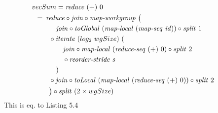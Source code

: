 \begin{align}
  &\hspace{-1.5em}vecSum = \reduce\ (+)\ 0\nonumber\\
  &\hspace{-2em}\quad\begin{aligned}
    &=\hspace{.2em}
      \reduce \circ \join \circ \mapWorkgroup\ \big(\\
      &\qquad\quad \join \circ \toGlobal\ (\mapLocal\ (\mapSeq\ \id)) \circ \splitN\ 1\\
      &\qquad \circ \iterateN\ (log_2\ wgSize)\ (\\
      &\qquad\qquad \join \circ \mapLocal\ (\reduceSeq\ (+)\ 0) \circ \splitN\ 2\\
      &\qquad\qquad \circ \reorderStride\ s\\
      &\qquad\quad)\\
      &\qquad \circ \join \circ \toLocal\ (\mapLocal\ (\reduceSeq\ (+)\ 0)) \circ \splitN\ 2\\
      &\qquad\big) \circ \splitN\ (2\times wgSize)
  \end{aligned}
\end{align}
This is eq. to Listing 5.4

